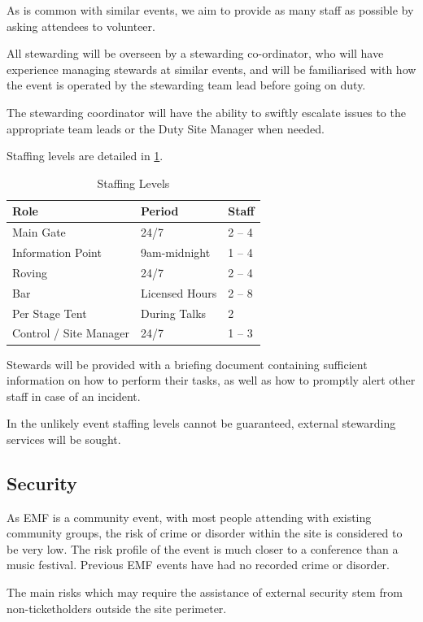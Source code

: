 As is common with similar events, we aim to provide as many staff as possible
by asking attendees to volunteer. 

All stewarding will be overseen by a stewarding co-ordinator, who
will have experience managing stewards at similar events, and will be familiarised
with how the event is operated by the stewarding team lead before going on duty.

The stewarding coordinator will have the ability to swiftly
escalate issues to the appropriate team leads or the Duty Site Manager when needed.

Staffing levels are detailed in \cref{table:staff}.

\begin{table}[h!]
\caption{Staffing Levels}
\label{table:staff}
\centering
\begin{tabular}{| l l l |}
    \hline
    \textbf{Role} & \textbf{Period} & \textbf{Staff} \\
    \hline
    Main Gate & 24/7 & 2 -- 4 \\
    Information Point & 9am-midnight & 1 -- 4 \\
    Roving & 24/7 & 2 -- 4 \\
    Bar & Licensed Hours & 2 -- 8 \\
    Per Stage Tent & During Talks & 2 \\
    Control / Site Manager & 24/7 & 1 -- 3 \\
    \hline
\end{tabular}
\end{table}

Stewards will be provided with a briefing document containing sufficient information on how to perform
their tasks, as well as how to promptly alert other staff in case of an incident.

In the unlikely event staffing levels cannot be guaranteed, external stewarding services will be sought.

\subsection{Security}

As EMF is a community event, with most people attending with existing community groups, the risk of crime
or disorder within the site is considered to be very low. The risk profile of the event is much closer
to a conference than a music festival. Previous EMF events have had no recorded crime or disorder.

The main risks which may require the assistance of external security
stem from non-ticketholders outside the site perimeter.

